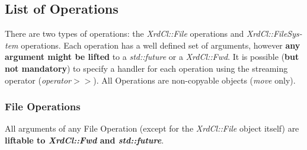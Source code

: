 \documentclass{article}
\begin{document}
	\subsection{List of Operations}
	\label{sec:lsop}
	
		There are two types of operations: the \textit{XrdCl::File} operations and \textit{XrdCl::FileSys-tem} operations. Each operation has a well defined
		set of arguments, however \textbf{any argument might be lifted} to a \textit{std::future} or a \textit{XrdCl::Fwd}. It is possible (\textbf{but not mandatory})
		to specify a handler for each operation using the streaming operator (\textit{operator$>$$>$}). All Operations are non-copyable objects (\textit{move} only).
		
		\subsubsection{File Operations}
		
			All arguments of any File Operation (except for the \textit{XrdCl::File} object itself) are \textbf{liftable to \textit{XrdCl::Fwd} and \textit{std::future}}.
			
\end{document}
